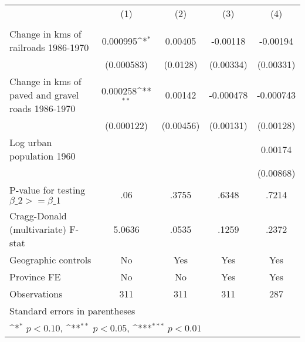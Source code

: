 {
\def\sym#1{\ifmmode^{#1}\else\(^{#1}\)\fi}
\begin{tabular}{l*{4}{c}}
\hline\hline
                &\multicolumn{1}{c}{(1)}&\multicolumn{1}{c}{(2)}&\multicolumn{1}{c}{(3)}&\multicolumn{1}{c}{(4)}\\
                &\multicolumn{1}{c}{}&\multicolumn{1}{c}{}&\multicolumn{1}{c}{}&\multicolumn{1}{c}{}\\
\hline
Change in kms of railroads 1986-1970& 0.000995\sym{*}  &  0.00405         & -0.00118         & -0.00194         \\
                &(0.000583)         & (0.0128)         &(0.00334)         &(0.00331)         \\
[1em]
Change in kms of paved and gravel roads 1986-1970& 0.000258\sym{**} &  0.00142         &-0.000478         &-0.000743         \\
                &(0.000122)         &(0.00456)         &(0.00131)         &(0.00128)         \\
[1em]
Log urban population 1960&                  &                  &                  &  0.00174         \\
                &                  &                  &                  &(0.00868)         \\
\hline
P-value for testing $\beta\_{2} >= \beta\_{1}$&      .06         &    .3755         &    .6348         &    .7214         \\
Cragg-Donald (multivariate) F-stat&   5.0636         &    .0535         &    .1259         &    .2372         \\
Geographic controls&       No         &      Yes         &      Yes         &      Yes         \\
Province FE     &       No         &       No         &      Yes         &      Yes         \\
Observations    &      311         &      311         &      311         &      287         \\
\hline\hline
\multicolumn{5}{l}{\footnotesize Standard errors in parentheses}\\
\multicolumn{5}{l}{\footnotesize \sym{*} \(p<0.10\), \sym{**} \(p<0.05\), \sym{***} \(p<0.01\)}\\
\end{tabular}
}
